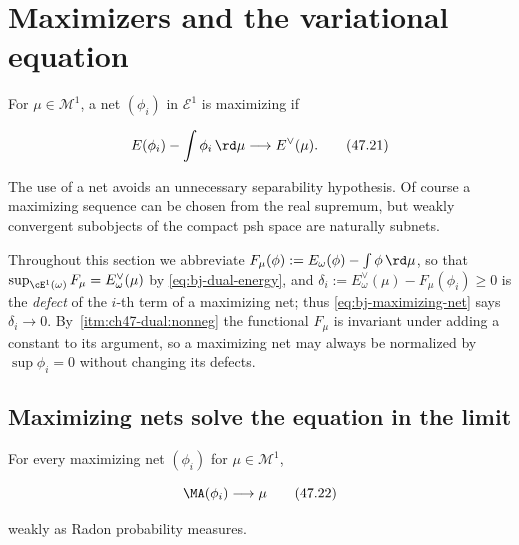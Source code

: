 \section{Maximizers and the variational equation}
\label{sec:ch47-orthogonality}

\begin{definition}
\label{def:ch47-maximizing-net}
For $\mu\in\mathcal M^1$, a net $(\phi_i)$ in $\mathcal E^1$ is
maximizing if

\[
       E(\phi_i)-\int\phi_i\,\rd \mu\longrightarrow E^\vee(\mu).
\tag{47.21}\label{eq:bj-maximizing-net}
\]
\end{definition}

The use of a net avoids an unnecessary separability hypothesis.  Of course
a maximizing sequence can be chosen from the real supremum, but weakly
convergent subobjects of the compact psh space are naturally subnets.

Throughout this section we abbreviate
$F_\mu(\phi):=E_\omega(\phi)-\int\phi\,\rd\mu$, so that
$\sup_{\cE^1(\omega)}F_\mu=E^\vee_\omega(\mu)$ by
\eqref{eq:bj-dual-energy}, and
$\delta_i:=E^\vee_\omega(\mu)-F_\mu(\phi_i)\ge0$ is the \emph{defect} of
the $i$-th term of a maximizing net; thus
\eqref{eq:bj-maximizing-net} says $\delta_i\to0$.  By
\,\cref{itm:ch47-dual:nonneg} the functional
$F_\mu$ is invariant under adding a constant to its argument, so a
maximizing net may always be normalized by $\sup\phi_i=0$ without
changing its defects.

\subsection{Maximizing nets solve the equation in the limit}
\label{sec:ch47-maximizers-converge}

\begin{theorem}\label{thm:bj-maximizers-converge}
For every maximizing net $(\phi_i)$ for
$\mu\in\mathcal M^1$,

\[
                         \MA(\phi_i)\longrightarrow\mu
\tag{47.22}\label{eq:bj-maximizer-ma-weak}
\]

weakly as Radon probability measures.
\end{theorem}

